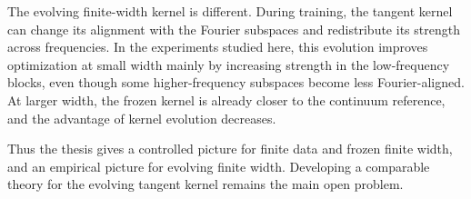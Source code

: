 The evolving finite-width kernel is different. During training, the tangent
kernel can change its alignment with the Fourier subspaces and redistribute its
strength across frequencies. In the experiments studied here, this evolution
improves optimization at small width mainly by increasing strength in the
low-frequency blocks, even though some higher-frequency subspaces become less
Fourier-aligned. At larger width, the frozen kernel is already closer to the
continuum reference, and the advantage of kernel evolution decreases.

Thus the thesis gives a controlled picture for finite data and frozen finite
width, and an empirical picture for evolving finite width. Developing a
comparable theory for the evolving tangent kernel remains the main open problem.
